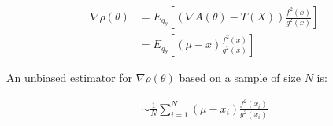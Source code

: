 \documentclass{article}
\begin{document}
\begin{align*}
\nabla \rho(\theta) &= E_{q_{\theta}} \left[ (\nabla A(\theta) - T(X)) \frac{f^{2}(x)}{g^{2}(x)} \right] \\
                    &= E_{q_{\theta}} \left[ (\mu - x) \frac{f^{2}(x)}{g^{2}(x)} \right] 
\end{align*}

An unbiased estimator for $\nabla \rho(\theta)$ based on a sample of size $N$ is:

\begin{align*}
\sim \frac{1}{N} \sum_{i=1}^{N} (\mu-x_i) \frac{f^{2}(x_i)}{g^{2}(x_i)}
\end{align*}
\end{document}
